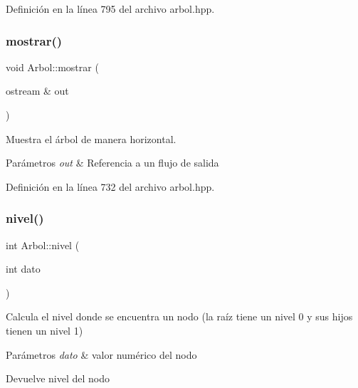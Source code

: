 Definición en la línea 795 del archivo arbol.\+hpp.

\mbox{\label{classArbol_a61749974f55056420f4e5a76eb664809}} 
\subsubsection{\texorpdfstring{mostrar()}{mostrar()}}
{\footnotesize\ttfamily void Arbol\+::mostrar (\begin{DoxyParamCaption}\item[{ostream \&}]{out }\end{DoxyParamCaption})}



Muestra el árbol de manera horizontal. 


\begin{DoxyParams}{Parámetros}
{\em out} & Referencia a un flujo de salida \\
\hline
\end{DoxyParams}


Definición en la línea 732 del archivo arbol.\+hpp.

\mbox{\label{classArbol_accd2dd2f8012067c1a2d77fd14c64546}} 
\subsubsection{\texorpdfstring{nivel()}{nivel()}\hspace{0.1cm}{\footnotesize\ttfamily [1/2]}}
{\footnotesize\ttfamily int Arbol\+::nivel (\begin{DoxyParamCaption}\item[{int}]{dato }\end{DoxyParamCaption})}



Calcula el nivel donde se encuentra un nodo (la raíz tiene un nivel 0 y sus hijos tienen un nivel 1) 


\begin{DoxyParams}{Parámetros}
{\em dato} & valor numérico del nodo \\
\hline
\end{DoxyParams}
\begin{DoxyReturn}{Devuelve}
nivel del nodo 
\end{DoxyReturn}


